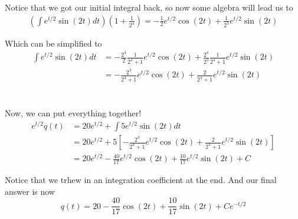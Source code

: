 Notice that we got our initial integral back, so now some algebra will lead us to
\begin{align*}
\left( \int e^{t/2}\sin(2t) dt \right) \left(1 + \frac{1}{2^4} \right) =
-\frac{1}{2}e^{t/2}\cos(2t) + \frac{1}{2^3} e^{t/2}\sin(2t)
\end{align*}

Which can be simplified to
\begin{align*}
\int e^{t/2}\sin(2t) dt   &=
-\frac{2^4}{2}\frac{1}{2^4+1} e^{t/2}\cos(2t) + \frac{2^4}{2^3}\frac{1}{2^4+1} e^{t/2}\sin(2t) \\
&= -\frac{2^3}{2^4+1}e^{t/2}\cos(2t) + \frac{2}{2^4+1} e^{t/2}\sin(2t)
\end{align*}
\\~\\

Now, we can put everything together!
\begin{align*}
e^{t/2} q(t) &= 20 e^{t/2} + \int 5 e^{t/2} \sin(2t) dt \\
&= 20 e^{t/2} + 5 \left[ -\frac{2^3}{2^4+1}e^{t/2}\cos(2t) + \frac{2}{2^4+1} e^{t/2}\sin(2t) \right] \\
&= 20 e^{t/2} -\frac{40}{17}e^{t/2}\cos(2t) + \frac{10}{17} e^{t/2}\sin(2t) + C
\end{align*}

Notice that we trhew in an integration coefficient at the end.
And our final answer is now
$$
q(t) =
20 -\frac{40}{17}\cos(2t) + \frac{10}{17} \sin(2t) + Ce^{-t/2}
$$